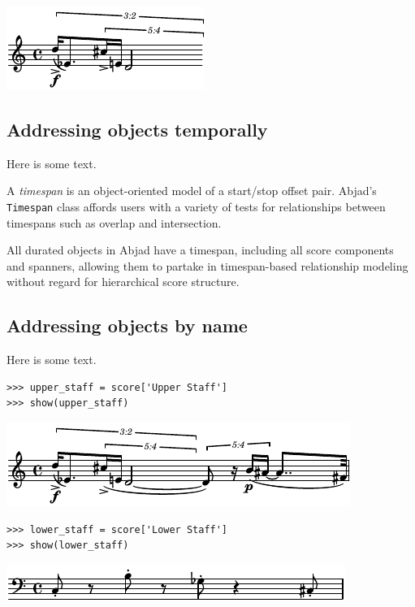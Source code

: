 \includegraphics[scale=1.0]{images/score_addressability-1.pdf}


\subsection{Addressing objects temporally}

Here is some text.

A \emph{timespan} is an object-oriented model of a start/stop offset pair.
Abjad's \texttt{Timespan} class affords users with a variety of tests for
relationships between timespans such as overlap and intersection.

All durated objects in Abjad have a timespan, including all score components
and spanners, allowing them to partake in timespan-based relationship modeling
without regard for hierarchical score structure.

\subsection{Addressing objects by name}

Here is some text.

\begin{lstlisting}
>>> upper_staff = score['Upper Staff']
>>> show(upper_staff)
\end{lstlisting}

\includegraphics[scale=1.0]{images/score_addressability-2.pdf}


\begin{lstlisting}
>>> lower_staff = score['Lower Staff']
>>> show(lower_staff)
\end{lstlisting}

\includegraphics[scale=1.0]{images/score_addressability-3.pdf}


